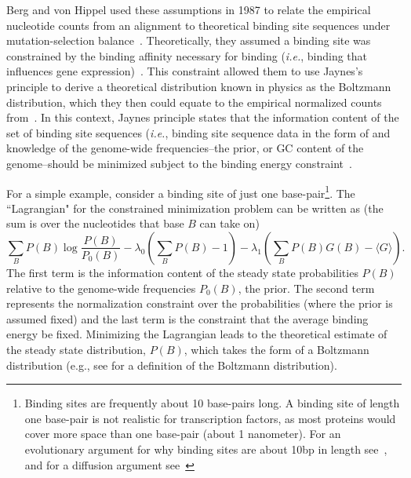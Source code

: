 Berg and von Hippel used these assumptions in 1987 to relate the empirical nucleotide counts from an alignment to theoretical binding site sequences under mutation-selection balance~\cite{pmid3612791}.  Theoretically, they assumed a binding site was constrained by the binding affinity necessary for binding (\textit{i.e.}, binding that influences gene expression)~\cite{Berg15081992}.  This constraint allowed them to use Jaynes's principle to derive a theoretical distribution known in physics as the Boltzmann distribution, which they then could equate to the empirical normalized counts from~.  In this context, Jaynes principle states that the information content of the set of binding site sequences (\textit{i.e.}, binding site sequence data in the form of  and knowledge of the genome-wide frequencies--the prior, or GC content of the genome--should be minimized subject to the binding energy constraint~\cite{hobson}.

For a simple example, consider a binding site of just one base-pair\footnote{Binding sites are frequently about 10 base-pairs long.  A binding site of length one base-pair is not realistic for transcription factors, as most proteins would cover more space than one base-pair (about 1 nanometer).  For an evolutionary argument for why binding sites are about 10bp in length see~\cite{pmid22887818}, and for a diffusion argument see~\cite{pmid21723826}}. The ``Lagrangian" for the constrained minimization problem can be written as (the sum is over the nucleotides that base $B$ can take on)
\begin{equation}\label{lagrangian}
\sum_B{P(B)\log{\frac{P(B)}{P_0(B)}}} -\lambda_0(\sum_B P(B) -1) - \lambda_1(\sum_B P(B)G(B)-\langle G\rangle).
\end{equation}
The first term is the information content of the steady state probabilities $P(B)$ relative to the genome-wide frequencies $P_0(B)$, the prior.  The second term represents the normalization constraint over the probabilities (where the prior is assumed fixed) and the last term is the constraint that the average binding energy be fixed.  Minimizing the Lagrangian leads to the theoretical estimate of the steady state distribution, $P(B)$, which takes the form of a Boltzmann distribution (e.g., see  for a definition of the Boltzmann distribution).

